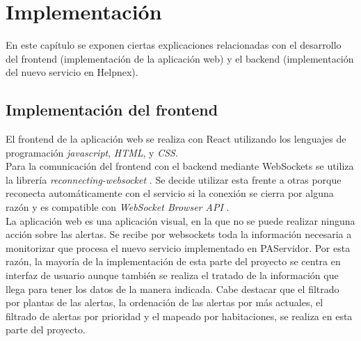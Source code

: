 \chapter{Implementación}

En este capítulo se exponen ciertas explicaciones relacionadas con el desarrollo del frontend (implementación de la aplicación web) y el backend (implementación del nuevo servicio en Helpnex).

\section{Implementación del frontend}

El frontend de la aplicación web se realiza con React utilizando los lenguajes de programación \textit{javascript}, \textit{HTML}, y \textit{CSS}.\\

Para la comunicación del frontend con el backend mediante WebSockets se utiliza la librería \textit{reconnecting-websocket} \cite{reconect-ws}. Se decide utilizar esta frente a otras porque reconecta automáticamente con el servicio si la conexión se cierra por alguna razón y es compatible con \textit{WebSocket Browser API} \cite{api-ws-front}. \\


La aplicación web es una aplicación visual, en la que no se puede realizar ninguna acción sobre las alertas. Se recibe por websockets toda la información necesaria a monitorizar que procesa el nuevo servicio implementado en PAServidor. Por esta razón, la mayoría de la implementación de esta parte del proyecto se centra en interfaz de usuario aunque también se realiza el tratado de la información que llega para tener los datos de la manera indicada. Cabe destacar que el filtrado por plantas de las alertas, la ordenación de las alertas por más actuales, el filtrado de alertas por prioridad y el mapeado por habitaciones, se realiza en esta parte del proyecto.\\


